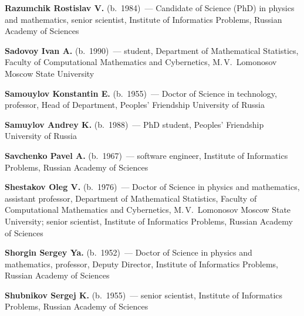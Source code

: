 \begin{multicols}{2}
\vspace*{3pt}

\noindent \textbf{Razumchik Rostislav V.} (b.\ 1984)~--- Candidate of Science 
(PhD) in physics and mathematics, senior scientist, Institute of Informatics 
Problems, Russian Academy of Sciences

\vspace*{3pt}

\noindent
\textbf{Sadovoy Ivan A.} (b.\ 1990)~--- student, Department of Mathematical Statistics, 
Faculty of Computational Mathematics and Cybernetics, M.\,V.~Lomonosov Moscow 
State University

\vspace*{3pt}

\noindent \textbf{Samouylov Konstantin E.} (b.\ 1955)~--- Doctor of Science in 
technology, professor, Head of Department, Peoples' Friendship University of 
Russia

\vspace*{3pt}

\noindent \textbf{Samuylov Andrey K.} (b.\ 1988)~--- PhD student, Peoples' 
Friendship University of Russia



\vspace*{3pt}

\noindent
\textbf{Savchenko Pavel A.} (b.\ 1967)~--- software engineer, Institute of Informatics 
Problems, Russian Academy of Sciences 

\vspace*{3pt}

\noindent
\textbf{Shestakov Oleg V.} (b.\ 1976)~--- Doctor of Science in physics and mathematics, 
assistant professor, Department of Mathematical Statistics, Faculty of 
Computational Mathematics and Cybernetics, M.\,V.~Lomonosov Moscow State 
University; senior scientist, Institute of Informatics Problems, Russian 
Academy of Sciences


\pagebreak

\noindent \textbf{Shorgin Sergey Ya.} (b.\ 1952)~--- Doctor of Science in 
physics and mathematics, professor, Deputy Director, Institute of Informatics 
Problems, Russian Academy of Sciences

\vspace*{3pt}



\noindent
\textbf{Shubnikov Sergej K.} (b.\ 1955)~--- senior scientist, Institute of Informatics 
Problems, Russian Academy of Sciences


\end{multicols}
